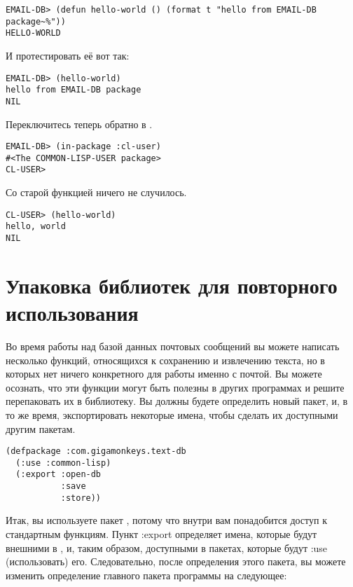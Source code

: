 \begin{lstlisting}
EMAIL-DB> (defun hello-world () (format t "hello from EMAIL-DB package~%"))
HELLO-WORLD
\end{lstlisting}

И протестировать её вот так:

\begin{lstlisting}
EMAIL-DB> (hello-world)
hello from EMAIL-DB package
NIL
\end{lstlisting}

Переключитесь теперь обратно в .

\begin{lstlisting}
EMAIL-DB> (in-package :cl-user)
#<The COMMON-LISP-USER package>
CL-USER> 
\end{lstlisting}

Со старой функцией ничего не случилось.

\begin{lstlisting}
CL-USER> (hello-world)
hello, world
NIL
\end{lstlisting}

\section{Упаковка библиотек для повторного использования}

Во время работы над базой данных почтовых сообщений вы можете написать несколько функций,
относящихся к сохранению и извлечению текста, но в которых нет ничего конкретного для
работы именно с почтой. Вы можете осознать, что эти функции могут быть полезны в других
программах и решите перепаковать их в библиотеку. Вы должны будете определить новый пакет,
и, в то же время, экспортировать некоторые имена, чтобы сделать их доступными другим
пакетам.

\begin{lstlisting}
(defpackage :com.gigamonkeys.text-db
  (:use :common-lisp)
  (:export :open-db   
           :save
           :store))
\end{lstlisting}

Итак, вы используете пакет  , потому что внутри
 вам понадобится доступ к стандартным функциям. Пункт
:export определяет имена, которые будут внешними в , и,
таким образом, доступными в пакетах, которые будут :use (использовать) его. Следовательно,
после определения этого пакета, вы можете изменить определение главного пакета программы
на следующее:

